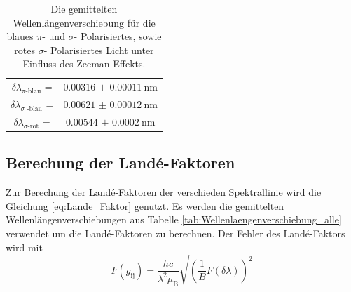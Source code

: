 \begin{table}
    \centering
    \caption{Die gemittelten Wellenlängenverschiebung für die blaues $\pi$- und $\sigma$- Polarisiertes, sowie rotes $\sigma$- Polarisiertes Licht unter Einfluss des Zeeman Effekts.}
    \begin{tabular}{cc}
        \midrule
        $\delta \lambda _\text{$\pi$-blau}$ = & $\SI{0.00316(011)}{\nano\meter}$ \\
        $\delta \lambda _\text{$\sigma$ -blau}$ =& $\SI{0.00621(012)}{\nano\meter}$ \\
        $\delta \lambda _\text{$\sigma$-rot}$ =&  $\SI{0.00544(020)}{\nano\meter}$ \\
        \bottomrule
    \end{tabular}
    \label{tab:Wellenlaengenverschiebung_alle}
\end{table}

\subsection{Berechung der Landé-Faktoren}

Zur Berechung der Landé-Faktoren der verschieden Spektrallinie wird die Gleichung \eqref{eq:Lande_Faktor} genutzt.
Es werden die gemittelten Wellenlängenverschiebungen aus Tabelle \autoref{tab:Wellenlaengenverschiebung_alle} verwendet um die Landé-Faktoren zu berechnen.
Der Fehler des Landé-Faktors wird mit 
\begin{equation*}
    F(g_\text{ij}) = \frac{hc}{\lambda^2 \mu _\text{B}} \sqrt{\left ( \frac{1}{B} F(\delta \lambda) \right)^2}
\end{equation*}
